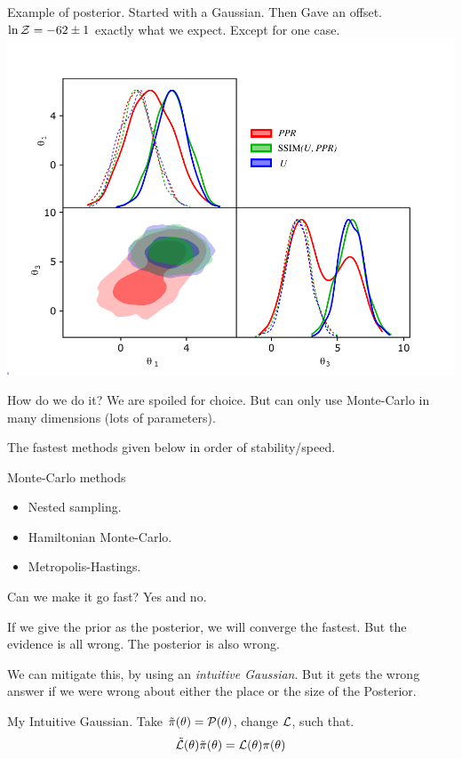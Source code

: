 \documentclass[bigger]{beamer}
\begin{document}
\begin{frame}[label={sec:orgf5b3dfe}]{Example of posterior.}
  Started with a \alert{Gaussian}. Then Gave an \alert{offset}.
  \(\ln {\cal Z} = -62 \pm 1\) exactly what we expect. Except for
  \alert{one} case.
  \includegraphics[width=.75\linewidth]{./illustrations/convergence.pdf}
  
\end{frame}
\begin{frame}[label={sec:org083fab8}]{How do we do it?}
We are spoiled for choice. But can only use Monte-Carlo in many
dimensions (lots of parameters).

The fastest methods given below in order of stability/speed. 
\begin{block}{Monte-Carlo methods}
\begin{itemize}
\item Nested sampling.
\item Hamiltonian Monte-Carlo.
\item Metropolis-Hastings.
\end{itemize}
\end{block}
\end{frame}


\begin{frame}[label={sec:orgcf084f1}]{Can we make it go fast?}
Yes and no. 

If we give the prior as the posterior, we will converge the
fastest. But the evidence is all wrong. The posterior is also wrong. 

We can mitigate this, by using an \emph{intuitive Gaussian}. But it gets
the wrong answer if we were wrong about either the place or the size
of the Posterior.
\begin{block}{My Intuitive Gaussian.}
Take \(\tilde{\pi}(\theta) = {\cal P}(\theta)\), change \({\cal L}\), such that. 
\begin{equation*}
\tilde{\cal L}(\theta)\tilde{\pi}(\theta) = {\cal L}(\theta)\pi(\theta)
\end{equation*}
\end{block}
\end{frame}
\end{document}
